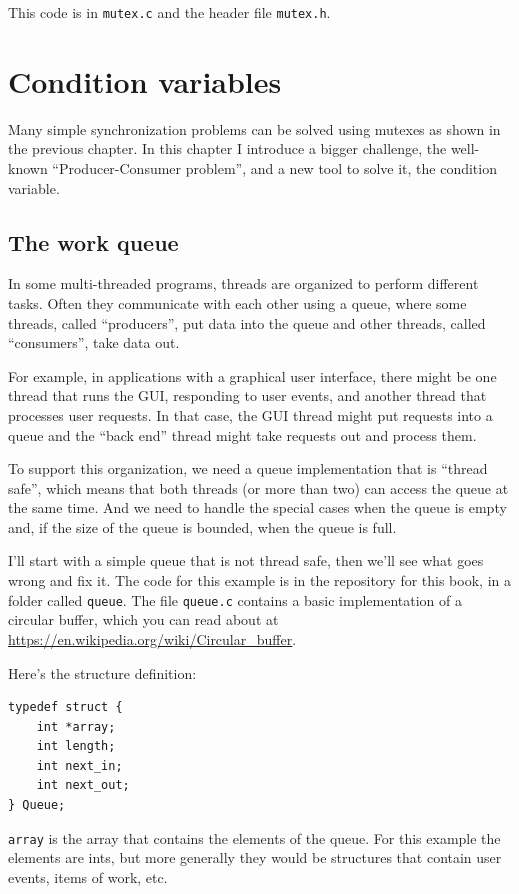 \documentclass[12pt]{book}
\begin{document}
{This code is in {\tt mutex.c} and the header file {\tt mutex.h}.


\chapter{Condition variables}
\label{csem}

Many simple synchronization problems can be solved using mutexes
as shown in the previous chapter.  In this chapter I introduce a
bigger challenge, the well-known ``Producer-Consumer problem'', and
a new tool to solve it, the condition variable.

\section{The work queue}
\label{queue}

In some multi-threaded programs, threads are organized to perform
different tasks.  Often they communicate with each other using a queue,
where some threads, called ``producers'', put data into the queue
and other threads, called ``consumers'', take data out.

For example, in applications with a graphical user interface, there
might be one thread that runs the GUI, responding to user events,
and another thread that processes user requests.  In that case,
the GUI thread might put requests into a queue and the ``back end''
thread might take requests out and process them.

To support this organization, we need a queue implementation that is
``thread safe'', which means that both threads (or more than two) can
access the queue at the same time.  And we need to handle the special
cases when the queue is empty and, if the size of the queue is
bounded, when the queue is full.

I'll start with a simple queue that is not thread safe, then we'll see
what goes wrong and fix it.  The code for this example is in the
repository for this book, in a folder called {\tt queue}.  The file
{\tt queue.c} contains a basic implementation of a circular buffer,
which you can read about at
\url{https://en.wikipedia.org/wiki/Circular_buffer}.

Here's the structure definition:

\begin{verbatim}
typedef struct {
    int *array;
    int length;
    int next_in;
    int next_out;
} Queue;
\end{verbatim}

{\tt array} is the array that contains the elements of the queue.
For this example the elements are ints, but more generally
they would be structures that contain user events, items of work, etc.

}
\end{document}
